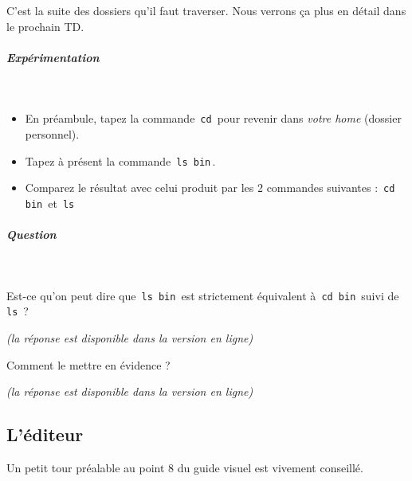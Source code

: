 \documentclass[11pt,a4paper]{article}
\begin{document}
					C'est la suite des dossiers qu'il faut traverser. 
					Nous verrons \c ca plus en d\'etail dans le prochain TD.
				
            \par
        
			
		\subparagraph{Exp\'erimentation} 
		
					\textcolor{white}{.} \par
				
            \par
        
					\begin{itemize}
				
			\item 
						En pr\'eambule, tapez la commande \,\verb|cd|\,
						pour revenir dans \textit{votre home}
						(dossier personnel).
					
			\item 
						Tapez \`a pr\'esent la commande \,\verb|ls bin|\,.
					
			\item 
						Comparez le r\'esultat avec celui produit par les 2 commandes suivantes :
						\,\verb|cd bin|\, et
						\,\verb|ls|\,
					\end{itemize}
				
			
		\subparagraph{Question} 
		
					\textcolor{white}{.} \par
				
            \par
        
					Est-ce qu'on peut dire que \,\verb|ls bin|\,
					est strictement \'equivalent \`a \,\verb|cd bin|\,
					suivi de \,\verb|ls|\, ?
				
            \par
         {\footnotesize\emph{(la r\'eponse est disponible dans la version en ligne)}\par} Comment le mettre en \'evidence ?
            \par
         {\footnotesize\emph{(la r\'eponse est disponible dans la version en ligne)}\par} \subsection{L'\'editeur}
					Un petit tour pr\'ealable au point 8 du guide visuel est vivement conseill\'e.
				
\end{document}
